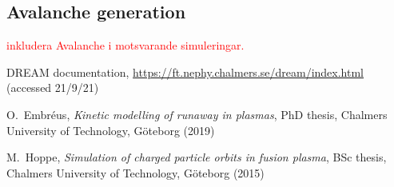 \documentclass[11pt,a4paper]{article}
\begin{document}
\subsection{Avalanche generation}
\textcolor{red}{inkludera Avalanche i motsvarande simuleringar.}

\begin{thebibliography}{100}
    DREAM documentation, \url{https://ft.nephy.chalmers.se/dream/index.html} (accessed 21/9/21)

    O.\ Embréus, \textit{Kinetic modelling of runaway in plasmas}, PhD thesis, Chalmers University of Technology, Göteborg (2019)

    M.\ Hoppe, \textit{Simulation of charged particle orbits in fusion plasma}, BSc thesis, Chalmers University of Technology, Göteborg (2015)

\end{thebibliography}
\end{document}
